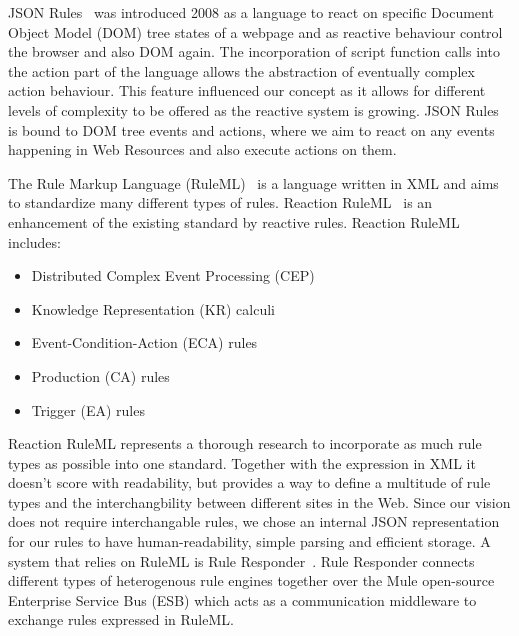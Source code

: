 \textrm{JSON Rules}~\cite{2008-Giurca_Pascalau-JSON_Rules.pdf} was introduced 2008 as a language to react on specific \textrm{Document Object Model} (\textrm{DOM}) tree states of a webpage and as reactive behaviour control the browser and also \textrm{DOM} again.
The incorporation of script function calls into the action part of the language allows the abstraction of eventually complex action behaviour.
This feature influenced our concept as it allows for different levels of complexity to be offered as the reactive system is growing.
\textrm{JSON Rules} is bound to \textrm{DOM} tree events and actions, where we aim to react on any events happening in Web Resources and also execute actions on them.

The \textrm{Rule Markup Language} (\textrm{RuleML})~\cite{2006-Boley-RuleML.pdf} is a language written in \textrm{XML} and aims to standardize many different types of rules.
\textrm{Reaction RuleML}~\cite{2012-Paschke_etal-ReactionRuleML.pdf} is an enhancement of the existing standard by reactive rules.
\textrm{Reaction RuleML} includes:
\begin{itemize}
  \item Distributed Complex Event Processing (\textrm{CEP})
  \item Knowledge Representation (\textrm{KR}) calculi
  \item Event-Condition-Action (\textrm{ECA}) rules
  \item Production (\textrm{CA}) rules
  \item Trigger (\textrm{EA}) rules
\end{itemize}
\textrm{Reaction RuleML} represents a thorough research to incorporate as much rule types as possible into one standard.
Together with the expression in \textrm{XML} it doesn't score with readability, but provides a way to define a multitude of rule types and the interchangbility between different sites in the Web.
Since our vision does not require interchangable rules, we chose an internal JSON representation for our rules to have human-readability, simple parsing and efficient storage.
A system that relies on \textrm{RuleML} is \textrm{Rule Responder}~\cite{2007-Paschke_etal-RuleResponder.pdf}.
\textrm{Rule Responder} connects different types of heterogenous rule engines together over the \textrm{Mule} open-source \textrm{Enterprise Service Bus} (\textrm{ESB}) which acts as a communication middleware to exchange rules expressed in \textrm{RuleML}.

